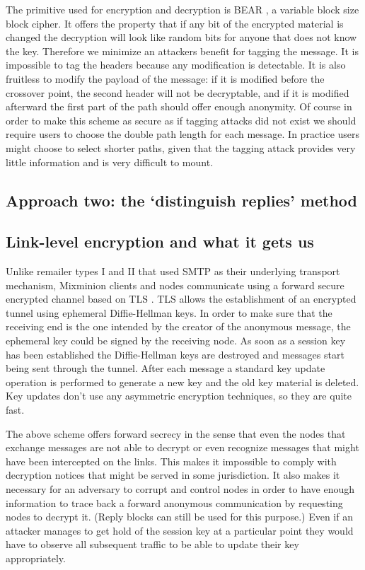 \documentclass{llncs}
\begin{document}
The primitive used for encryption and decryption is BEAR \cite{BEAR},
a variable block size block cipher. It offers the property that if any
bit of the encrypted material is changed the decryption will look like
random bits for anyone that does not know the key. Therefore we minimize
an attackers benefit for tagging the message. It is impossible to tag the
headers because any modification is detectable. It is also fruitless to
modify the payload of the message: if it is modified before the crossover
point, the second header will not be decryptable, and if it is modified
afterward the first part of the path should offer enough anonymity. Of
course in order to make this scheme as secure as if tagging attacks did
not exist we should require users to choose the double path length for
each message. In practice users might choose to select shorter paths,
given that the tagging attack provides very little information and is
very difficult to mount.

\subsection{Approach two: the `distinguish replies' method}
\label{subsec:distinguish-replies}


\subsection{Link-level encryption and what it gets us}

Unlike remailer types I and II that used SMTP as their underlying
transport mechanism, Mixminion clients and nodes communicate using a
forward secure encrypted channel based on TLS \cite{TLS}.  TLS allows
the establishment of an encrypted tunnel using ephemeral
Diffie-Hellman keys. In order to make sure that the receiving end is
the one intended by the creator of the anonymous message, the
ephemeral key could be signed by the receiving node. As soon as a
session key has been established the Diffie-Hellman keys are destroyed
and messages start being sent through the tunnel. After each message a
standard key update operation is performed to generate a new key and
the old key material is deleted. Key updates don't use any asymmetric
encryption techniques, so they are quite fast.

The above scheme offers forward secrecy in the sense that even the
nodes that exchange messages are not able to decrypt or even recognize
messages that might have been intercepted on the links. This makes it
impossible to comply with decryption notices that might be served in
some jurisdiction.  It also makes it necessary for an adversary to
corrupt and control nodes in order to have enough information to trace
back a forward anonymous communication by requesting nodes to decrypt
it. (Reply blocks can still be used for this purpose.)  Even if an
attacker manages to get hold of the session key at a particular point
they would have to observe all subsequent traffic to be able to update
their key appropriately.
\end{document}
